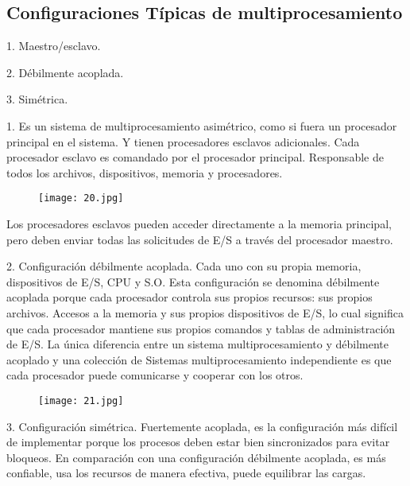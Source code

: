 \begin{center}
\subsection{Configuraciones Típicas de multiprocesamiento}
\end{center}

1. Maestro/esclavo.

2. Débilmente acoplada.

3. Simétrica.

1. Es un sistema de multiprocesamiento asimétrico, como si fuera un procesador principal en el sistema. Y tienen procesadores esclavos adicionales. Cada procesador esclavo es comandado por el procesador principal.
Responsable de todos los archivos, dispositivos, memoria y procesadores.

\begin{figure}[h!]
		\centering
		{\texttt{[image: 20.jpg]}\par} \vspace{1cm}
\end{figure}

Los procesadores esclavos pueden acceder directamente a la memoria principal, pero deben enviar todas las solicitudes de E/S a través del procesador maestro.\hfill \break

2. Configuración débilmente acoplada.\hfill \break
Cada uno con su propia memoria, dispositivos de E/S, CPU y S.O. Esta configuración se denomina débilmente acoplada porque cada procesador controla sus propios recursos: sus propios archivos. Accesos a la memoria y sus propios dispositivos de E/S, lo cual significa que cada procesador mantiene sus propios comandos y tablas de administración de E/S.
La única diferencia entre un sistema multiprocesamiento y débilmente acoplado y una colección de Sistemas multiprocesamiento independiente es que cada procesador puede comunicarse y cooperar con los otros.

\begin{figure}[h!]
		\centering
		{\texttt{[image: 21.jpg]}\par} \vspace{1cm}
\end{figure}

3. Configuración simétrica.\hfill \break
Fuertemente acoplada, es la configuración más difícil de implementar porque los procesos deben estar bien sincronizados para evitar bloqueos. En comparación con una configuración débilmente acoplada, es más confiable, usa los recursos de manera efectiva, puede equilibrar las cargas.

